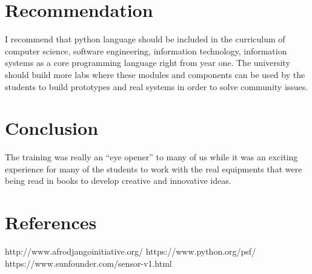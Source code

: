 \documentclass{article}
\begin{document}
\section{Recommendation}
I recommend that python language should be included in the curriculum of computer science, software engineering, information technology, information systems as a core programming language right from year one.
The university should build more labs where these modules and components can be used by the students to build prototypes and real systems in order to solve community issues.
\section{Conclusion}
The training was really an “eye opener” to many of us while it was an exciting experience for many of the students to work with the real equipments that were being read in books to develop creative and innovative ideas.
\section{References}
http://www.afrodjangoinitiative.org/
\newline
https://www.python.org/psf/
\newline
https://www.sunfounder.com/sensor-v1.html
\end{document}

